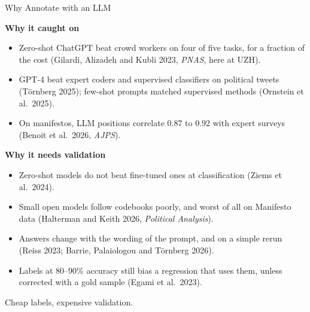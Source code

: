 \begin{frame}{Why Annotate with an LLM}

\footnotesize
\textbf{Why it caught on}
\begin{itemize}
    \setlength{\itemsep}{2pt}
    \item Zero-shot ChatGPT beat crowd workers on four of five tasks, for a fraction of the cost (Gilardi, Alizadeh and Kubli 2023, \textit{PNAS}, here at UZH).
    \item GPT-4 beat expert coders and supervised classifiers on political tweets (T\"ornberg 2025); few-shot prompts matched supervised methods (Ornstein et al.\ 2025).
    \item On manifestos, LLM positions correlate 0.87 to 0.92 with expert surveys (Benoit et al.\ 2026, \textit{AJPS}).
\end{itemize}

\vspace{0.15cm}

\textbf{Why it needs validation}
\begin{itemize}
    \setlength{\itemsep}{2pt}
    \item Zero-shot models do not beat fine-tuned ones at classification (Ziems et al.\ 2024).
    \item Small open models follow codebooks poorly, and worst of all on Manifesto data (Halterman and Keith 2026, \textit{Political Analysis}).
    \item Answers change with the wording of the prompt, and on a simple rerun (Reiss 2023; Barrie, Palaiologou and T\"ornberg 2026).
    \item Labels at 80--90\% accuracy still bias a regression that uses them, unless corrected with a gold sample (Egami et al.\ 2023).
\end{itemize}

\vspace{0.1cm}
\centering
\alert{Cheap labels, expensive validation.}

\end{frame}

